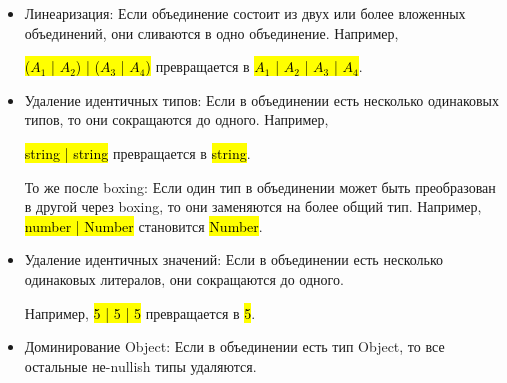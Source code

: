 \begin{itemize}[left=2em]
    \item Линеаризация: Если объединение состоит из двух или более вложенных объединений, они сливаются в одно объединение.
    Например,

    \hl{($A_1$ | $A_2$) | ($A_3$ | $A_4$)} превращается в \hl{$A_1$ | $A_2$ | $A_3$ | $A_4$}.
    \item Удаление идентичных типов: Если в объединении есть несколько одинаковых типов, то они сокращаются до одного.
    Например,

    \hl{string | string} превращается в \hl{string}.

    То же после boxing: Если один тип в объединении может быть преобразован в другой через boxing, то они заменяются на
    более общий тип.
    Например, \hl{number | Number} становится \hl{Number}.
    \item Удаление идентичных значений: Если в объединении есть несколько одинаковых литералов, они сокращаются до одного.

    Например, \hl{5 | 5 | 5} превращается в \hl{5}.
    \item Доминирование Object: Если в объединении есть тип Object, то все остальные не-nullish типы удаляются.


\end{itemize}
